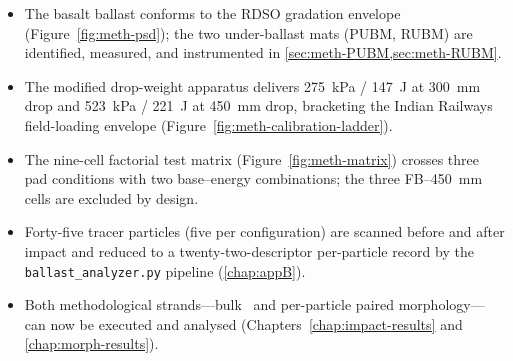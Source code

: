 \begin{chaptertakeaways}
\begin{itemize}[leftmargin=*,itemsep=2pt,topsep=2pt]
    \item The basalt ballast conforms to the \gls{RDSO} gradation
          envelope (Figure~\ref{fig:meth-psd}); the two under-ballast
          mats (\gls{PUBM}, \gls{RUBM}) are identified, measured, and
          instrumented in \cref{sec:meth-PUBM,sec:meth-RUBM}.
    \item The modified drop-weight apparatus delivers
          \SI{275}{\kilo\pascal} / \SI{147}{\joule} at
          \SI{300}{\milli\metre} drop and \SI{523}{\kilo\pascal} /
          \SI{221}{\joule} at \SI{450}{\milli\metre} drop, bracketing
          the Indian Railways field-loading envelope
          (Figure~\ref{fig:meth-calibration-ladder}).
    \item The nine-cell factorial test matrix
          (Figure~\ref{fig:meth-matrix}) crosses three pad conditions
          with two base--energy combinations; the three
          \gls{FB}--\SI{450}{\milli\metre} cells are excluded by
          design.
    \item Forty-five tracer particles (five per configuration) are
          scanned before and after impact and reduced to a
          twenty-two-descriptor per-particle record by the
          \texttt{ballast\_analyzer.py} pipeline (\cref{chap:appB}).
    \item Both methodological strands---bulk \FIIN\ and per-particle
          paired morphology---can now be executed and analysed
          (Chapters~\ref{chap:impact-results} and
          \ref{chap:morph-results}).
\end{itemize}
\end{chaptertakeaways}
